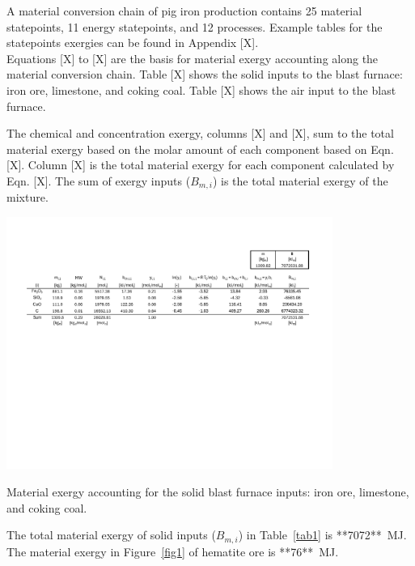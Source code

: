 \documentclass[energies,article,submit,pdftex,moreauthors]{Definitions/mdpi}
\begin{document}
A material conversion chain
of pig iron production
contains 25 material statepoints,
11 energy statepoints,
and 12 processes.
Example tables for the statepoints exergies
can be found in Appendix [X].\\

Equations [X] to [X] are the basis for material exergy accounting
along the material conversion chain.
Table [X] shows the solid inputs
to the blast furnace: iron ore, limestone, and coking coal.
Table [X] shows the air input
to the blast furnace.


The chemical and concentration exergy,
columns [X] and [X],
sum to the total material exergy
based on the molar amount
of each component
based on Eqn. [X].
Column [X] is the total material exergy
for each component
calculated by Eqn. [X].
The sum of exergy inputs ($B_{m,i}$)
is the total material exergy
of the mixture.


\begin{table}
  \centering
  \includegraphics[width=0.8\textwidth]{images/Solid BF Inputs.pdf}
  \caption{Material exergy accounting for the solid blast furnace inputs: iron ore, limestone, and coking coal.}
  \label{fig:Solid Blast Furnace Inputs}
\end{table}



The total material exergy of solid inputs ($B_{m,i}$)
in Table~\ref{tab1} is **7072**~MJ.
The material exergy in Figure~\ref{fig1}
of hematite ore is **76**~MJ.
\end{document}
